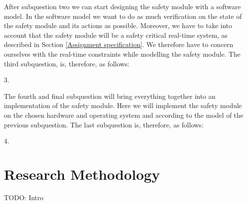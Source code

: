 \documentclass[12pt]{scrreprt}
\begin{document}
After subquestion two we can start designing the safety module with a software model. In the software model we want to do as much verification on the state of the safety module and its actions as possible. Moreover, we have to take into account that the safety module will be a safety critical real-time system, as described in Section \ref{Assignment specification}.
We therefore have to concern ourselves with the real-time constraints while modelling the safety module. The third subquestion, is, therefore, as follows:

\begin{flushleft}
3. \textit{\sqthree}
\end{flushleft}

The fourth and final subquestion will bring everything together into an implementation of the safety module. Here we will implement the safety module on the chosen hardware and operating system and according to the model of the previous subquestion. The last subquestion is, therefore, as follows:

\begin{flushleft}
4. \textit{\sqfour}
\end{flushleft}

\chapter{Research Methodology}
TODO: Intro
\end{document}
